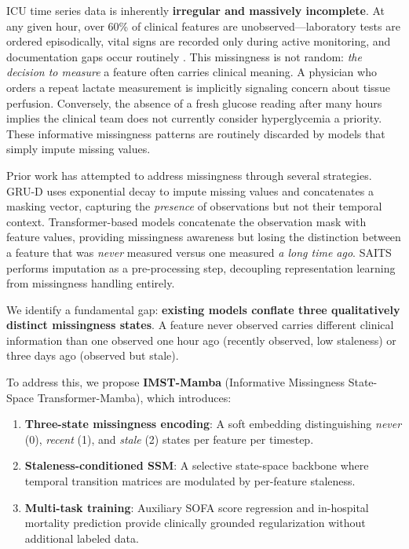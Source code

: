\documentclass[11pt,a4paper]{article}
\begin{document}
ICU time series data is inherently \textbf{irregular and massively incomplete}.
At any given hour, over 60\% of clinical features are unobserved—laboratory
tests are ordered episodically, vital signs are recorded only during active
monitoring, and documentation gaps occur routinely \citep{che2018gruD}.  This
missingness is not random: \emph{the decision to measure} a feature often
carries clinical meaning.  A physician who orders a repeat lactate measurement
is implicitly signaling concern about tissue perfusion.  Conversely, the absence
of a fresh glucose reading after many hours implies the clinical team does not
currently consider hyperglycemia a priority.  These informative missingness
patterns are routinely discarded by models that simply impute missing values.

Prior work has attempted to address missingness through several strategies.
GRU-D \citep{che2018gruD} uses exponential decay to impute missing values and
concatenates a masking vector, capturing the \emph{presence} of observations
but not their temporal context.  Transformer-based models
\citep{tipirneni2022selfsupervised} concatenate the observation mask with
feature values, providing missingness awareness but losing the distinction
between a feature that was \emph{never} measured versus one measured \emph{a
long time ago}.  SAITS \citep{du2023saits} performs imputation as a
pre-processing step, decoupling representation learning from missingness
handling entirely.

We identify a fundamental gap: \textbf{existing models conflate three
qualitatively distinct missingness states}.  A feature never observed carries
different clinical information than one observed one hour ago (recently
observed, low staleness) or three days ago (observed but stale).

To address this, we propose \textbf{IMST-Mamba} (Informative Missingness
State-Space Transformer-Mamba), which introduces:
\begin{enumerate}
  \item \textbf{Three-state missingness encoding}: A soft embedding
        distinguishing \emph{never} (0), \emph{recent} (1), and \emph{stale}
        (2) states per feature per timestep.
  \item \textbf{Staleness-conditioned SSM}: A selective state-space backbone
        where temporal transition matrices are modulated by per-feature
        staleness.
  \item \textbf{Multi-task training}: Auxiliary SOFA score regression and
        in-hospital mortality prediction provide clinically grounded
        regularization without additional labeled data.
\end{enumerate}
\end{document}
